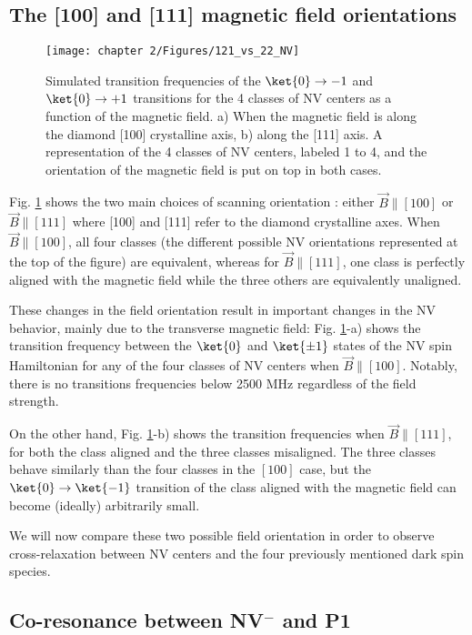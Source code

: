 \documentclass[a4paper, 11pt]{report}
\begin{document}
\subsection{The [100] and [111] magnetic field orientations}
\label{sec simu}

\begin{figure}[h]
\centering
\texttt{[image: chapter 2/Figures/121\_vs\_22\_NV]}
\caption{Simulated transition frequencies of the $\ket{0} \to {-1}$ and $\ket{0} \to {+1}$ transitions for the 4 classes of NV centers as a function of the magnetic field. a) When the magnetic field is along the diamond [100] crystalline axis, b) along the [111] axis. A representation of the 4 classes of NV centers, labeled 1 to 4, and the orientation of the magnetic field is put on top in both cases.}
\label{121 vs 22 NV}
\end{figure}

Fig. \ref{121 vs 22 NV} shows the two main choices of scanning orientation : either $\vec{B} \parallel [100]$ or 
$\vec{B} \parallel [111]$ where [100] and [111] refer to the diamond crystalline axes. When $\vec{B} \parallel [100]$, all four classes (the different possible NV orientations represented at the top of the figure) are equivalent, whereas for $\vec{B} \parallel [111]$, one class is perfectly aligned with the magnetic field while the three others are equivalently unaligned. 

These changes in the field orientation result in important changes in the NV behavior, mainly due to the transverse magnetic field: Fig. \ref{121 vs 22 NV}-a) shows the transition frequency between the $\ket{0}$ and $\ket{\pm 1}$ states of the NV spin Hamiltonian for any of the four classes of NV centers when $\vec{B} \parallel [100]$. Notably, there is no transitions frequencies below 2500 MHz regardless of the field strength. 

On the other hand, Fig. \ref{121 vs 22 NV}-b) shows the transition frequencies when $\vec{B} \parallel [111]$, for both the class aligned and the three classes misaligned. The three classes behave similarly than the four classes in the $[100]$ case, but the $\ket{0}\to\ket{-1}$ transition of the class aligned with the magnetic field can become (ideally) arbitrarily small.

We will now compare these two possible field orientation in order to observe cross-relaxation between NV centers and the four previously mentioned dark spin species.

\subsection{Co-resonance between NV$^-$ and P1}
\end{document}
